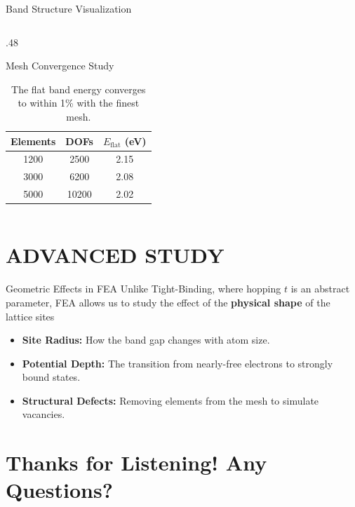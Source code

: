 \documentclass[svgnames, aspectratio = 1610]{beamer}
\begin{document}
\begin{frame}{Band Structure Visualization}
\begin{columns}
\begin{column}{.48\linewidth}
{\begin{exampleblock}{Mesh Convergence Study}
        \vskip-6pt
        \begin{table}\footnotesize
          \caption{The flat band energy converges to within 1\% with the
            finest mesh.}
          \centering
          \begin{tabular}{ccc}
            \toprule
            Elements & DOFs & $E_{\text{flat}}$ (eV) \\
            \midrule
            1200 & 2500 & 2.15 \\
            3000 & 6200 & 2.08 \\
            5000 & 10200 & 2.02 \\
            \bottomrule
          \end{tabular}
        \end{table}
      \end{exampleblock}
      }
    \end{column}
  \end{columns}
\end{frame}

\section{ADVANCED STUDY}

\begin{frame}{Geometric Effects in FEA}
  Unlike Tight-Binding, where hopping $t$ is an abstract parameter, FEA allows
  us to study the effect of the \textbf{physical shape} of the lattice sites
  \pause
  \begin{itemize}[<+->]
    \item \textbf{Site Radius:} How the band gap changes with atom size.
    \item \textbf{Potential Depth:} The transition from nearly-free electrons
    to strongly bound states.
    \item \textbf{Structural Defects:} Removing elements from the mesh to
    simulate vacancies.
  \end{itemize}
\end{frame}

\section{Thanks for Listening! Any Questions?}
\end{document}
